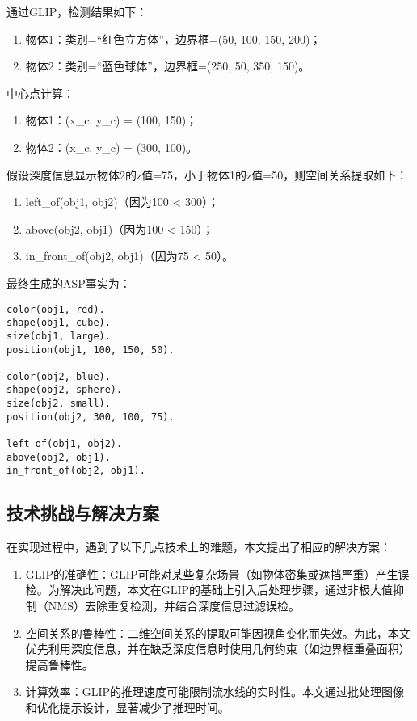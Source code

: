通过GLIP，检测结果如下：
\begin{enumerate}
\item 物体1：类别=“红色立方体”，边界框=(50, 100, 150, 200)；
\item 物体2：类别=“蓝色球体”，边界框=(250, 50, 350, 150)。
\end{enumerate}

中心点计算：
\begin{enumerate}
    \item 物体1：(x\_c, y\_c) = (100, 150)；
    \item 物体2：(x\_c, y\_c) = (300, 100)。
\end{enumerate}

假设深度信息显示物体2的z值=75，小于物体1的z值=50，则空间关系提取如下：
\begin{enumerate}
\item left\_of(obj1, obj2)（因为100 < 300）；
\item above(obj2, obj1)（因为100 < 150）；
\item in\_front\_of(obj2, obj1)（因为75 < 50）。
\end{enumerate}

最终生成的ASP事实为：
\begin{lstlisting}
color(obj1, red).
shape(obj1, cube).
size(obj1, large).
position(obj1, 100, 150, 50).

color(obj2, blue).
shape(obj2, sphere).
size(obj2, small).
position(obj2, 300, 100, 75).

left_of(obj1, obj2).
above(obj2, obj1).
in_front_of(obj2, obj1).
\end{lstlisting}
\subsection{技术挑战与解决方案}
在实现过程中，遇到了以下几点技术上的难题，本文提出了相应的解决方案：
\begin{enumerate}[label=(\arabic*),itemsep=0pt,parsep=0pt]
\item GLIP的准确性：GLIP可能对某些复杂场景（如物体密集或遮挡严重）产生误检。为解决此问题，本文在GLIP的基础上引入后处理步骤，通过非极大值抑制（NMS）去除重复检测，并结合深度信息过滤误检。
\item 空间关系的鲁棒性：二维空间关系的提取可能因视角变化而失效。为此，本文优先利用深度信息，并在缺乏深度信息时使用几何约束（如边界框重叠面积）提高鲁棒性。
\item 计算效率：GLIP的推理速度可能限制流水线的实时性。本文通过批处理图像和优化提示设计，显著减少了推理时间。
\end{enumerate}
